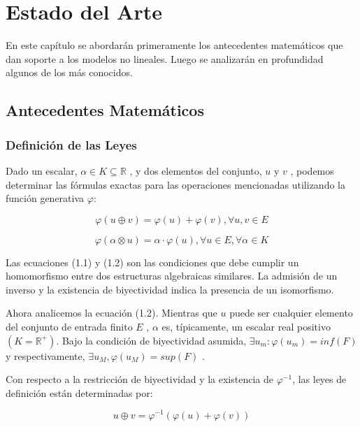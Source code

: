 \chapter{Estado del Arte}\label{chapter:state-of-the-art}

En este cap\'itulo se abordar\'an primeramente los antecedentes matem\'aticos que dan soporte a los modelos no lineales. Luego se analizar\'an en profundidad algunos de los m\'as conocidos.

\section{Antecedentes Matemáticos}

\subsection{Definición de las Leyes}

Dado un escalar, $\alpha \in K \subseteq \mathbb{R}$ , y dos elementos del conjunto, $u$ y $v$ , podemos determinar las fórmulas exactas para las operaciones mencionadas utilizando la función generativa $\varphi$:

\begin{equation}
	\varphi(u\oplus v) = \varphi(u)+\varphi(v), \forall u,v \in E
\end{equation}

\begin{equation}
	\varphi(\alpha \otimes u) = \alpha \cdot \varphi(u), \forall u \in E, \forall \alpha \in K
\end{equation}

Las ecuaciones (1.1) y (1.2) son las condiciones que debe cumplir un homomorfismo entre dos estructuras algebraicas similares. La admisi\'on de un inverso y la existencia de biyectividad indica la presencia de un isomorfismo.

Ahora analicemos la ecuación (1.2). Mientras que $u$ puede ser cualquier elemento del conjunto de entrada finito $E$ , $\alpha$ es, típicamente, un escalar real positivo $(K=\mathbb{R}^+)$. Bajo la condición de biyectividad asumida, $\exists u_m: \varphi( u_m ) = inf( F )$ y respectivamente, $\exists u_M , \varphi ( u_M ) = sup( F )$ .

Con respecto a la restricción de biyectividad y la existencia de $\varphi^{-1}$, las leyes de definición están determinadas por:

\begin{equation}
	u \oplus v = \varphi^{-1}(\varphi(u)+\varphi(v))	
\end{equation}

